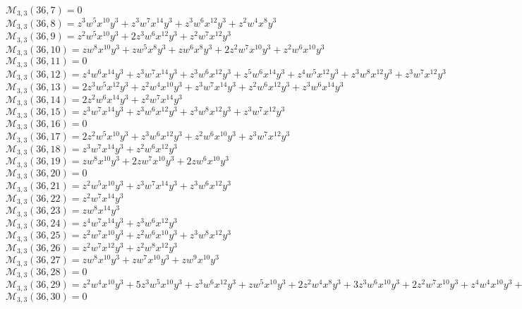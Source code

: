 \documentclass[12pt]{memoireuqam1.3}
\begin{document}
$\mathcal{M}_{3,3}(36,7)=0$\\
$\mathcal{M}_{3,3}(36,8)=z^3w^5x^{10}y^3+z^3w^7x^{14}y^3+z^3w^6x^{12}y^3+z^2w^4x^8y^3$\\
$\mathcal{M}_{3,3}(36,9)=z^2w^5x^{10}y^3+2z^3w^6x^{12}y^3+z^2w^7x^{12}y^3$\\
$\mathcal{M}_{3,3}(36,10)=zw^8x^{10}y^3+zw^5x^8y^3+zw^6x^8y^3+2z^2w^7x^{10}y^3+z^2w^6x^{10}y^3$\\
$\mathcal{M}_{3,3}(36,11)=0$\\
$\mathcal{M}_{3,3}(36,12)=z^4w^6x^{14}y^3+z^3w^7x^{14}y^3+z^3w^6x^{12}y^3+z^5w^6x^{14}y^3+z^4w^5x^{12}y^3+z^3w^8x^{12}y^3+z^3w^7x^{12}y^3$\\
$\mathcal{M}_{3,3}(36,13)=2z^3w^5x^{12}y^3+z^2w^4x^{10}y^3+z^3w^7x^{14}y^3+z^2w^6x^{12}y^3+z^3w^6x^{14}y^3$\\
$\mathcal{M}_{3,3}(36,14)=2z^2w^6x^{14}y^3+z^2w^7x^{14}y^3$\\
$\mathcal{M}_{3,3}(36,15)=z^3w^7x^{14}y^3+z^3w^6x^{12}y^3+z^3w^8x^{12}y^3+z^3w^7x^{12}y^3$\\
$\mathcal{M}_{3,3}(36,16)=0$\\
$\mathcal{M}_{3,3}(36,17)=2z^2w^5x^{10}y^3+z^3w^6x^{12}y^3+z^2w^6x^{10}y^3+z^3w^7x^{12}y^3$\\
$\mathcal{M}_{3,3}(36,18)=z^3w^7x^{14}y^3+z^2w^6x^{12}y^3$\\
$\mathcal{M}_{3,3}(36,19)=zw^8x^{10}y^3+2zw^7x^{10}y^3+2zw^6x^{10}y^3$\\
$\mathcal{M}_{3,3}(36,20)=0$\\
$\mathcal{M}_{3,3}(36,21)=z^2w^5x^{10}y^3+z^3w^7x^{14}y^3+z^3w^6x^{12}y^3$\\
$\mathcal{M}_{3,3}(36,22)=z^2w^7x^{14}y^3$\\
$\mathcal{M}_{3,3}(36,23)=zw^8x^{14}y^3$\\
$\mathcal{M}_{3,3}(36,24)=z^4w^7x^{14}y^3+z^3w^6x^{12}y^3$\\
$\mathcal{M}_{3,3}(36,25)=z^2w^7x^{10}y^3+z^2w^6x^{10}y^3+z^3w^8x^{12}y^3$\\
$\mathcal{M}_{3,3}(36,26)=z^2w^7x^{12}y^3+z^2w^8x^{12}y^3$\\
$\mathcal{M}_{3,3}(36,27)=zw^8x^{10}y^3+zw^7x^{10}y^3+zw^9x^{10}y^3$\\
$\mathcal{M}_{3,3}(36,28)=0$\\
$\mathcal{M}_{3,3}(36,29)=z^2w^4x^{10}y^3+5z^3w^5x^{10}y^3+z^3w^6x^{12}y^3+zw^5x^{10}y^3+2z^2w^4x^8y^3+3z^3w^6x^{10}y^3+2z^2w^7x^{10}y^3+z^4w^4x^{10}y^3+z^2w^5x^8y^3$\\
$\mathcal{M}_{3,3}(36,30)=0$\\
\end{document}
